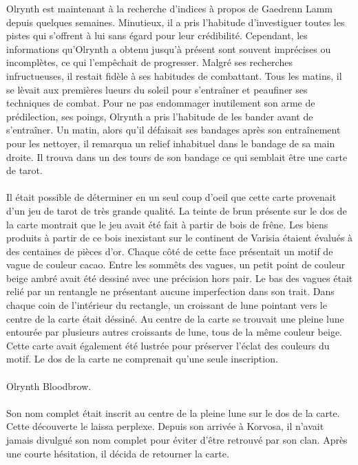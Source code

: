 \documentclass[main.tex]{subfiles}
\begin{document}
   Olrynth est maintenant à la recherche d'indices à propos de Gaedrenn Lamm depuis quelques semaines.
   Minutieux, il a pris l'habitude d'investiguer toutes les pistes qui s'offrent à lui sans égard pour leur crédibilité.
   Cependant, les informations qu'Olrynth a obtenu jusqu'à présent sont souvent imprécises ou incomplètes, ce qui l'empêchait de progresser.
   Malgré ses recherches infructueuses, il restait fidèle à ses habitudes de combattant.
   Tous les matins, il se lèvait aux premières lueurs du soleil pour s'entraîner et peaufiner ses techniques de combat.
   Pour ne pas endommager inutilement son arme de prédilection, ses poings, Olrynth a pris l'habitude de les bander avant de s'entraîner.
   Un matin, alors qu'il défaisait ses bandages après son entraînement pour les nettoyer, il remarqua un relief inhabituel dans le bandage de sa main droite.
   Il trouva dans un des tours de son bandage ce qui semblait être une carte de tarot.\\
   \\
   Il était possible de déterminer en un seul coup d'oeil que cette carte provenait d'un jeu de tarot de très grande qualité.
   La teinte de brun présente sur le dos de la carte montrait que le jeu avait été fait à partir de bois de frêne.
   Les biens produits à partir de ce bois inexistant sur le continent de Varisia étaient évalués à des centaines de pièces d'or.
   Chaque côté de cette face présentait un motif de vague de couleur cacao.
   Entre les sommêts des vagues, un petit point de couleur beige ambré avait été dessiné avec une précision hors pair.
   Le bas des vagues était relié par un rentangle ne présentant aucune imperfection dans son trait.
   Dans chaque coin de l'intérieur du rectangle, un croissant de lune pointant vers le centre de la carte était déssiné.
   Au centre de la carte se trouvait une pleine lune entourée par plusieurs autres croissants de lune, tous de la même couleur beige.
   Cette carte avait également été lustrée pour préserver l'éclat des couleurs du motif.
   Le dos de la carte ne comprenait qu'une seule inscription.\\
   \\
   Olrynth Bloodbrow.\\
   \\
   Son nom complet était inscrit au centre de la pleine lune sur le dos de la carte.
   Cette découverte le laissa perplexe.
   Depuis son arrivée à Korvosa, il n'avait jamais divulgué son nom complet pour éviter d'être retrouvé par son clan.
   Après une courte hésitation, il décida de retourner la carte.
\end{document}
